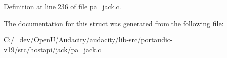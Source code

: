 Definition at line 236 of file pa\+\_\+jack.\+c.



The documentation for this struct was generated from the following file\+:\begin{DoxyCompactItemize}
\item 
C\+:/\+\_\+dev/\+Open\+U/\+Audacity/audacity/lib-\/src/portaudio-\/v19/src/hostapi/jack/\hyperlink{pa__jack_8c}{pa\+\_\+jack.\+c}\end{DoxyCompactItemize}
